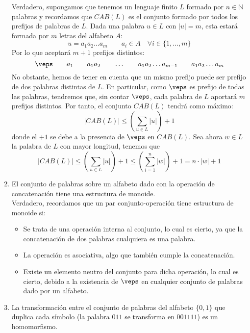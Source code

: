 \begin{enumerate}
        Verdadero, supongamos que tenemos un lenguaje finito $L$ formado por $n\in \mathbb{N}$ palabras y recordamos que $CAB(L)$ es el conjunto formado por todos los prefijos de palabras de $L$. Dada una palabra $u\in L$ con $|u| =m$, esta estará formada por $m$ letras del alfabeto $A$:
        \begin{equation*}
            u = a_1a_2\ldots a_{m} \qquad a_i \in A \quad \forall i \in \{1, \ldots, m\}
        \end{equation*}
        Por lo que aceptará $m+1$ prefijos distintos:
        \begin{equation*}
            \veps \qquad a_1 \qquad a_1a_2 \qquad \ldots \qquad a_1a_2\ldots a_{m-1} \qquad a_1a_2\ldots a_m
        \end{equation*}
        No obstante, hemos de tener en cuenta que un mismo prefijo puede ser prefijo de dos palabras distintas de $L$. En particular, como $\veps$ es prefijo de todas las palabras, tendremos que, sin contar $\veps$, cada palabra de $L$ aportará $m$ prefijos distintos. Por tanto, el conjunto $CAB(L)$ tendrá como máximo:
        \begin{equation*}
            |CAB(L)| \leq \left(\sum_{u\in L}|u|\right) +1
        \end{equation*}
        donde el $+1$ se debe a la presencia de $\veps$ en $CAB(L)$. Sea ahora $w\in L$ la palabra de $L$ con mayor longitud, tenemos que
        \begin{equation*}
            |CAB(L)| \leq \left(\sum_{u\in L}|u|\right) + 1 \leq \left(\sum_{i=1}^{n} |w|\right)+1 = n\cdot |w| + 1
        \end{equation*}
    \item El conjunto de palabras sobre un alfabeto dado con la operación de concatenación tiene una estructura de monoide.\\

        Verdadero, recordamos que un par conjunto-operación tiene estructura de monoide si:
        \begin{itemize}
            \item Se trata de una operación interna al conjunto, lo cual es cierto, ya que la concatenación de dos palabras cualquiera es una palabra.
            \item La operación es asociativa, algo que también cumple la concatenación.
            \item Existe un elemento neutro del conjunto para dicha operación, lo cual es cierto, debido a la existencia de $\veps$ en cualquier conjunto de palabras dado por un alfabeto.
        \end{itemize}
    \item La transformación entre el conjunto de palabras del alfabeto $\{0,1\}$ que duplica cada símbolo (la palabra $011$ se transforma en $001111$) es un homomorfismo.\\


\end{enumerate}
